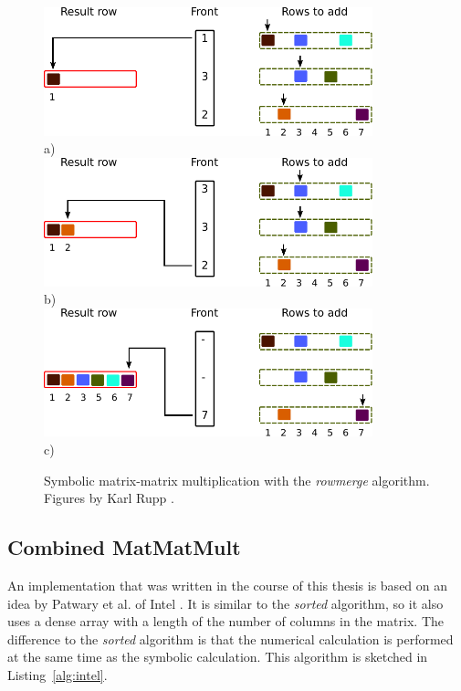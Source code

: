 \begin{figure}[H]
\centering
\includegraphics[width=0.85\textwidth]{row/spgemm-row-1}\\
a)\\
\vspace*{6mm}
\includegraphics[width=0.85\textwidth]{row/spgemm-row-2}\\
b)\\
\vspace*{6mm}
\includegraphics[width=0.85\textwidth]{row/spgemm-row-6}\\
c)\\
\vspace*{6mm}
\caption{Symbolic matrix-matrix multiplication with the \textit{rowmerge} algorithm. Figures by Karl Rupp \cite{karli_LANS_image}.}
\label{fig:spgemm-row}
\end{figure}


\subsection{Combined MatMatMult}
An implementation that was written in the course of this thesis is based on an idea by Patwary et al. of Intel \cite{intel_algorithm}. It is similar to the \textit{sorted} algorithm, so it also uses a dense array with a length of the number of columns in the matrix. The difference to the \textit{sorted} algorithm is that the  numerical calculation is performed at the same time as the symbolic calculation. This algorithm is sketched in Listing~\ref{alg:intel}.

